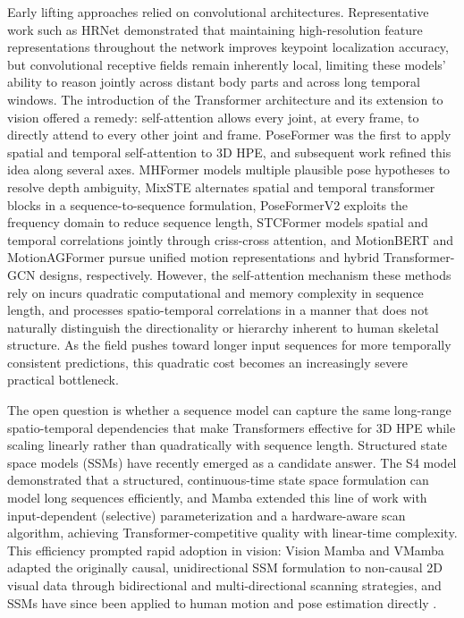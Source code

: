 Early lifting approaches relied on convolutional architectures.
Representative work such as HRNet \cite{sun2019hrnet} demonstrated that
maintaining high-resolution feature representations throughout the network
improves keypoint localization accuracy, but convolutional
receptive fields remain inherently local, limiting these models' ability
to reason jointly across distant body parts and across long temporal
windows. The introduction of the Transformer architecture
\cite{vaswani2017attention} and its extension to vision
\cite{dosovitskiy2020vit} offered a remedy: self-attention allows every
joint, at every frame, to directly attend to every other joint and frame.
PoseFormer \cite{zheng2021poseformer} was the first to apply spatial and
temporal self-attention to 3D HPE, and subsequent work refined this idea
along several axes. MHFormer \cite{li2022mhformer} models multiple
plausible pose hypotheses to resolve depth ambiguity, MixSTE
\cite{zhang2022mixste} alternates spatial and temporal transformer blocks
in a sequence-to-sequence formulation, PoseFormerV2
\cite{zhao2023poseformerv2} exploits the frequency domain to reduce
sequence length, STCFormer \cite{tang2023stcformer} models spatial and
temporal correlations jointly through criss-cross attention, and
MotionBERT \cite{zhu2023motionbert} and MotionAGFormer
\cite{mehraban2024motionagformer} pursue unified motion representations
and hybrid Transformer-GCN designs, respectively. However, the
self-attention mechanism these methods rely on incurs quadratic
computational and memory complexity in sequence length, and processes
spatio-temporal correlations in a manner that does not naturally
distinguish the directionality or hierarchy inherent to human skeletal
structure. As the field pushes toward longer input sequences for more
temporally consistent predictions, this quadratic cost becomes an
increasingly severe practical bottleneck.

The open question is whether a sequence model can capture the same
long-range spatio-temporal dependencies that make Transformers effective
for 3D HPE while scaling linearly rather than quadratically with sequence
length. Structured state space models (SSMs) have recently emerged as a
candidate answer. The S4 model \cite{gu2021s4} demonstrated that a
structured, continuous-time state space formulation can model long
sequences efficiently, and Mamba \cite{gu2023mamba} extended this line of
work with input-dependent (selective) parameterization and a
hardware-aware scan algorithm, achieving Transformer-competitive quality
with linear-time complexity. This efficiency prompted rapid adoption in
vision: Vision Mamba \cite{zhu2024visionmamba} and VMamba
\cite{liu2024vmamba} adapted the originally causal, unidirectional SSM
formulation to non-causal 2D visual data through bidirectional and
multi-directional scanning strategies, and SSMs have since been applied to
human motion and pose estimation directly
\cite{mondal2024hummuss, zhang2024posemagic, nguyen2025skeletonmamba,
zheng2025mambatopology, lu2025structureawaremamba, feng2025highresssm,
cui2025sasmamba, wang2025dbmambapose}.

